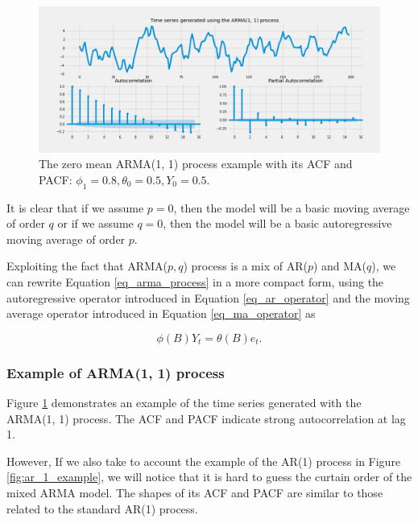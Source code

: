 \begin{figure}[!ht]
\centering
\includegraphics[width=1\textwidth, height=0.5\textwidth]{figures/chapter_03/arma_1_1.png}
\caption{The zero mean ARMA(1, 1) process example with its ACF and PACF: $\phi_1 = 0.8, \theta_0 = 0.5, Y_0 = 0.5$.}
\label{fig:arma_1_1_example}
\end{figure}

It is clear that if we assume $p = 0$, then the model will be a basic moving average of order $q$ or if we assume $q = 0$, then the model will be a basic autoregressive moving average of order $p$. 

Exploiting the fact that ARMA($p, q$) process is a mix of AR($p$) and MA($q$), we can rewrite Equation \ref{eq_arma_process} in a more compact form, using the autoregressive operator introduced in Equation \ref{eq_ar_operator} and the moving average operator introduced in Equation \ref{eq_ma_operator} as

\begin{equation}
    \phi(B)Y_t = \theta(B)e_t.
\end{equation}

\subsubsection{Example of ARMA(1, 1) process}

Figure \ref{fig:arma_1_1_example} demonstrates an example of
the time series generated with the ARMA(1, 1) process. The ACF and PACF indicate strong autocorrelation at lag 1. 

However, If we also take to account the example of the AR(1) process in Figure \ref{fig:ar_1_example}, we will notice that it is hard to guess the curtain order of the mixed ARMA model. The shapes of its ACF and PACF are similar to those related to the standard AR(1) process.  

